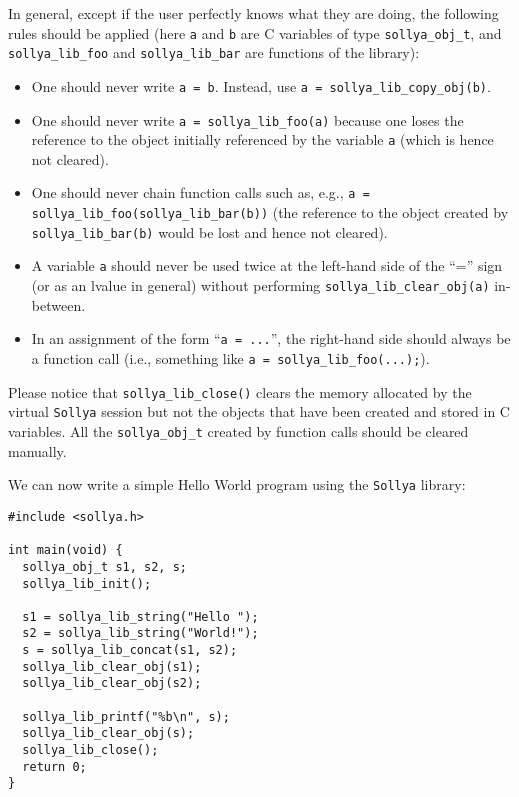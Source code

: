 \documentclass[a4paper]{article}
\newcommand{\sollya}{\texttt{Sollya}\xspace}
\begin{document}
In general, except if the user perfectly knows what they are doing, the following rules should be applied (here \texttt{a} and \texttt{b} are C variables of type \texttt{sollya\_obj\_t}, and \texttt{sollya\_lib\_foo} and \texttt{sollya\_lib\_bar} are functions of the library):
\begin{itemize}
\item One should never write \texttt{a = b}. Instead, use \texttt{a = sollya\_lib\_copy\_obj(b)}.
\item One should never write \texttt{a = sollya\_lib\_foo(a)} because one loses the reference to the object initially referenced by the variable \texttt{a} (which is hence not cleared).
\item One should never chain function calls such as, e.g., \texttt{a = sollya\_lib\_foo(sollya\_lib\_bar(b))} (the reference to the object created by \texttt{sollya\_lib\_bar(b)} would be lost and hence not cleared).
\item A variable \texttt{a} should never be used twice at the left-hand side of the ``='' sign (or as an lvalue in general) without performing \texttt{sollya\_lib\_clear\_obj(a)} in-between.
\item In an assignment of the form ``\texttt{a = ...}'', the right-hand side should always be a function call (i.e., something like \texttt{a = sollya\_lib\_foo(...);}).
\end{itemize}

Please notice that \texttt{sollya\_lib\_close()} clears the memory allocated by the virtual \sollya session but not the objects that have been created and stored in C variables. All the \texttt{sollya\_obj\_t} created by function calls should be cleared manually.

We can now write a simple Hello World program using the \sollya library:
\begin{center}\begin{minipage}{15cm}\begin{Verbatim}[frame=single]
#include <sollya.h>

int main(void) {
  sollya_obj_t s1, s2, s;
  sollya_lib_init();

  s1 = sollya_lib_string("Hello ");
  s2 = sollya_lib_string("World!");
  s = sollya_lib_concat(s1, s2);
  sollya_lib_clear_obj(s1);
  sollya_lib_clear_obj(s2);

  sollya_lib_printf("%b\n", s);
  sollya_lib_clear_obj(s);
  sollya_lib_close();
  return 0;
}
\end{Verbatim}
\end{minipage}\end{center}
\end{document}
